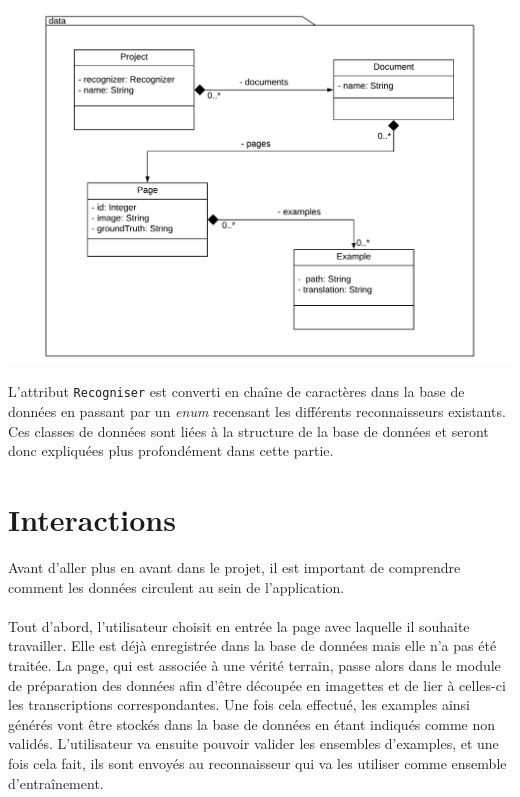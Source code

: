 \begin{mdframed}[frametitle={Figure 9 : Structure du package de données}, innerbottommargin=10]
\begin{center}
\includegraphics[scale=0.4]{assets/UML_data.pdf}
\end{center}
\end{mdframed}

L'attribut \texttt{Recogniser} est converti en chaîne de caractères dans la base de données en passant par un \textit{enum} recensant les différents reconnaisseurs existants. Ces classes de données sont liées à la structure de la base de données et seront donc expliquées plus profondément dans cette partie.

\section{Interactions}

Avant d'aller plus en avant dans le projet, il est important de comprendre comment les données circulent au sein de l'application. 

\paragraph{}
Tout d'abord, l'utilisateur choisit en entrée la page avec laquelle il souhaite travailler. Elle est déjà enregistrée dans la base de données mais elle n'a pas été traitée. La page, qui est associée à une vérité terrain, passe alors dans le module de préparation des données afin d'être découpée en imagettes et de lier à celles-ci les transcriptions correspondantes. Une fois cela effectué, les examples ainsi générés vont être stockés dans la base de données en étant indiqués comme non validés. L'utilisateur va ensuite pouvoir valider les ensembles d'examples, et une fois cela fait, ils sont envoyés au reconnaisseur qui va les utiliser comme ensemble d'entraînement.

